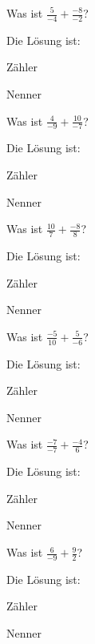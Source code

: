 \documentclass{ximera}
\begin{document}
\begin{shuffle}
\begin{question}
Was ist $\frac{5}{-4} + \frac{-8}{-2}$?
\begin{solution}
Die Lösung ist:

Zähler 

Nenner 
\end{solution}
\end{question}


\begin{question}
Was ist $\frac{4}{-9} + \frac{10}{-7}$?
\begin{solution}
Die Lösung ist:

Zähler 

Nenner 
\end{solution}
\end{question}


\begin{question}
Was ist $\frac{10}{7} + \frac{-8}{8}$?
\begin{solution}
Die Lösung ist:

Zähler 

Nenner 
\end{solution}
\end{question}


\begin{question}
Was ist $\frac{-5}{10} + \frac{5}{-6}$?
\begin{solution}
Die Lösung ist:

Zähler 

Nenner 
\end{solution}
\end{question}


\begin{question}
Was ist $\frac{-7}{-7} + \frac{-4}{6}$?
\begin{solution}
Die Lösung ist:

Zähler 

Nenner 
\end{solution}
\end{question}


\begin{question}
Was ist $\frac{6}{-9} + \frac{9}{2}$?
\begin{solution}
Die Lösung ist:

Zähler 

Nenner 
\end{solution}
\end{question}



\end{shuffle}
\end{document}
